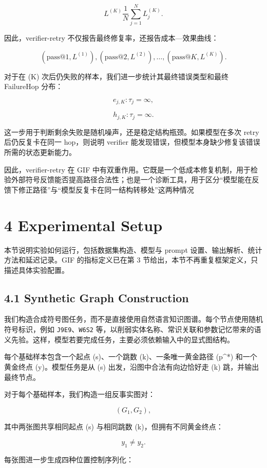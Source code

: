 \documentclass[
  11pt,
]{article}
\begin{document}
\[
L^{(K)}
\frac{1}{N}  
\sum_{j=1}^{N}  
L_j^{(K)}.  
\]

因此，verifier-retry 不仅报告最终修复率，还报告成本---效果曲线：

\[
(\mathrm{pass@}1,L^{(1)}),  
(\mathrm{pass@}2,L^{(2)}),  
\dots,  
(\mathrm{pass@}K,L^{(K)}).  
\]

对于在 (K) 次后仍失败的样本，我们进一步统计其最终错误类型和最终
FailureHop 分布：

\[
{e_{j,K}:\tau_j=\infty},  
\]

\[
{h_{j,K}:\tau_j=\infty}.  
\]

这一步用于判断剩余失败是随机噪声，还是稳定结构瓶颈。如果模型在多次 retry
后仍反复卡在同一 hop，则说明 verifier
能发现错误，但模型本身缺少修复该错误所需的状态更新能力。

因此，verifier-retry 在 GIF
中有双重作用。它既是一个低成本修复机制，用于检验外部符号反馈能否提高路径合法性；也是一个诊断工具，用于区分``模型能在反馈下修正路径''与``模型反复卡在同一结构转移处''这两种情况

\section{4 Experimental Setup}\label{experimental-setup}

本节说明实验如何运行，包括数据集构造、模型与 prompt
设置、输出解析、统计方法和延迟记录。GIF 的指标定义已在第 3
节给出，本节不再重复框架定义，只描述具体实验配置。

\subsection{4.1 Synthetic Graph
Construction}\label{synthetic-graph-construction}

我们构造合成符号图任务，而不是直接使用自然语言知识图谱。每个节点使用随机符号标识，例如
\texttt{J9E9}、\texttt{W6S2}
等，以削弱实体名称、常识关联和参数记忆带来的语义先验。这样，模型若要完成任务，主要必须依赖输入中的显式图结构。

每个基础样本包含一个起点 (s)、一个跳数 (k)、一条唯一黄金路径 (p\^{}*)
和一个黄金终点 (y)。模型任务是从 (s) 出发，沿图中合法有向边恰好走 (k)
跳，并输出最终节点。

对于每个基础样本，我们构造一组反事实图对：

\[
(G_1,G_2),  
\]

其中两张图共享相同起点 (s) 与相同跳数 (k)，但拥有不同黄金终点：

\[
y_1\neq y_2.  
\]

每张图进一步生成四种位置控制序列化：
\end{document}
